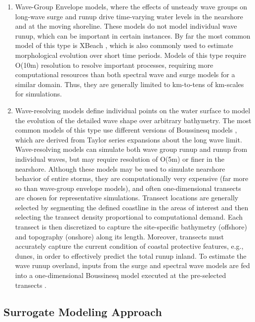 \begin{enumerate}
    \item Wave-Group Envelope models, where the effects of unsteady wave groups on long-wave surge and runup drive time-varying water levels in the nearshore and at the moving shoreline. These models do not model individual wave runup, which can be important in certain instances. By far the most common model of this type is XBeach \citep{roelvink2009modelling}, which is also commonly used to estimate morphological evolution over short time periods. Models of this type require O(10m) resolution to resolve important processes, requiring more computational resources than both spectral wave and surge models for a similar domain. Thus, they are generally limited to km-to-tens of km-scales for simulations.
    
    \item Wave-resolving models define individual points on the water surface to model the evolution of the detailed wave shape over arbitrary bathymetry. The most common models of this type use different versions of Boussinesq models \citep{lynett2002modeling, kennedy2000boussinesq, nwogu2010infragravity}, which are derived from Taylor series expansions about the long wave limit. Wave-resolving models can simulate both wave group runup and runup from individual waves, but may require resolution of O(5m) or finer in the nearshore. Although these models may be used to simulate nearshore behavior of entire storms, they are computationally very expensive (far more so than wave-group envelope models), and often one-dimensional transects are chosen for representative simulations. Transect locations are generally selected by segmenting the defined coastline in the areas of interest and then selecting the transect density proportional to computational demand. Each transect is then discretized to capture the site-specific bathymetry (offshore) and topography (onshore) along its length. Moreover, transects must accurately capture the current condition of coastal protective features, e.g., dunes, in order to effectively predict the total runup inland. To estimate the wave runup overland, inputs from the surge and spectral wave models are fed into a one-dimensional Boussinesq model executed at the pre-selected transects  \citep{demirbilek2009wave}. 
\end{enumerate}

\subsection{Surrogate Modeling Approach}

